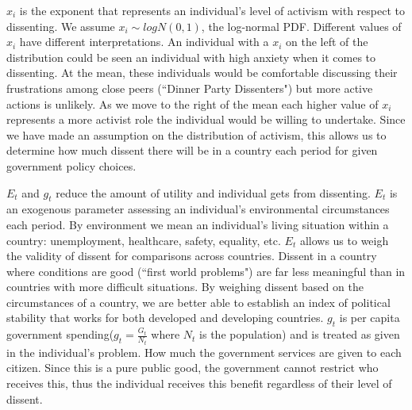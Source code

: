\documentclass[12pt]{article}
\begin{document}
\begin{spacing}{1.5}
$x_i$ is the exponent that represents an individual's level of activism with respect to dissenting. We assume $x_i \sim logN(0,1)$, the log-normal PDF. Different values of $x_i$ have different interpretations. An individual with a $x_i$ on the left of the distribution could be seen an individual with high anxiety when it comes to dissenting. At the mean, these individuals would be comfortable discussing their frustrations among close peers (``Dinner Party Dissenters") but more active actions is unlikely. As we move to the right of the mean each higher value of $x_i$ represents a more activist role the individual would be willing to undertake. Since we have made an assumption on the distribution of activism, this allows us to determine how much dissent there will be in a country each period for given government policy choices.    

$E_t$ and $g_t$ reduce the amount of utility and individual gets from dissenting. $E_t$ is an exogenous parameter assessing an individual's environmental circumstances each period. By environment we mean an individual's living situation within a country: unemployment, healthcare, safety, equality, etc. $E_t$ allows us to weigh the validity of dissent for comparisons across countries. Dissent in a country where conditions are good (``first world problems")  are far less meaningful than in countries with more difficult situations. By weighing dissent based on the circumstances of a country, we are better able to establish an index of political stability that works for both developed and developing countries. $g_t$ is per capita government spending($g_t=\frac{G_t}{N_t}$ where $N_t$ is the population) and is treated as given in the individual's problem. How much the government services are given to each citizen. Since this is a pure public good, the government cannot restrict who receives this, thus the individual receives this benefit regardless of their level of dissent. 





\end{spacing}
\end{document}
